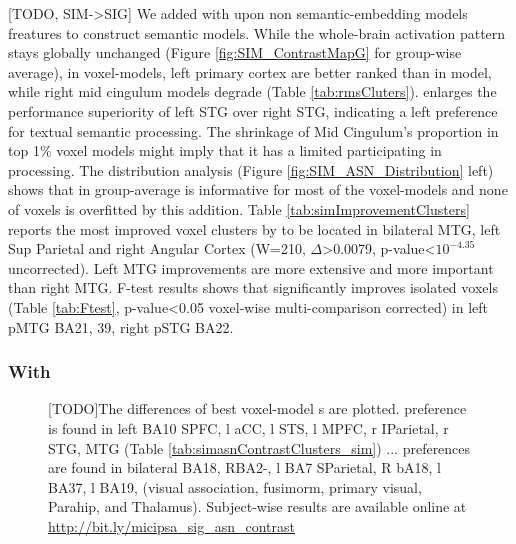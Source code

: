 [TODO, SIM->SIG]
We added with upon non semantic-embedding models  freatures to construct \similarity semantic models. While the whole-brain activation pattern stays globally unchanged (Figure \ref{fig:SIM_ContrastMapG} for group-wise average), in  voxel-models, left primary cortex are better ranked than in  model, while right mid cingulum models degrade (Table \ref{tab:rmsCluters}).  enlarges the performance superiority of left STG over right STG, indicating a left preference for textual semantic \similarity processing. The shrinkage of Mid Cingulum's proportion in top 1\% voxel models might imply that it has a limited participating in \similarity processing. The  distribution analysis (Figure \ref{fig:SIM_ASN_Distribution} left) shows that in group-average  is informative for most of the voxel-models and none of voxels is overfitted by this addition. Table \ref{tab:simImprovementClusters} reports the most improved voxel clusters by  to be located in bilateral MTG, left Sup Parietal and right Angular Cortex (W=210, \(\Delta\)>0.0079, p-value<\(10^{-4.35}\) uncorrected). Left MTG improvements are more extensive and more important than right MTG. F-test results shows that  significantly improves isolated voxels (Table \ref{tab:Ftest}, p-value<0.05 voxel-wise multi-comparison corrected) in left pMTG BA21, 39, right pSTG BA22.


\subsubsection{With }
\begin{figure}
    \centering
    \caption[- Contrast, Group]{[TODO]The differences of best voxel-model s are plotted.  preference is found in left BA10 SPFC, l aCC, l STS, l MPFC, r IParietal, r STG, MTG (Table \ref{tab:simasnContrastClusters_sim}) ...  preferences are found in bilateral BA18, RBA2-, l BA7 SParietal, R bA18, l BA37, l BA19, (visual association, fusimorm, primary visual, Parahip, and Thalamus). Subject-wise results are available online at \url{http://bit.ly/micipsa_sig_asn_contrast}} 
    \label{fig:EMB_SIG_ASN_ContrastMapG}
\end{figure}

